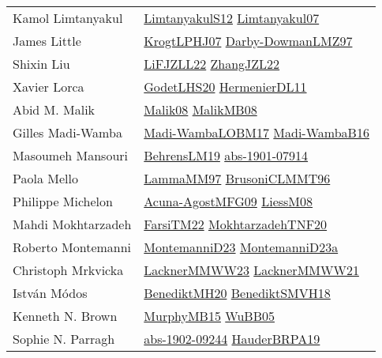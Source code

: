 {\begin{longtable}{p{4cm}p{20cm}}
Kamol Limtanyakul & \href{articles/LimtanyakulS12.pdf}{LimtanyakulS12}\cite{LimtanyakulS12} \href{papers/Limtanyakul07.pdf}{Limtanyakul07}\cite{Limtanyakul07} \\
James Little & \href{papers/KrogtLPHJ07.pdf}{KrogtLPHJ07}\cite{KrogtLPHJ07} \href{articles/Darby-DowmanLMZ97.pdf}{Darby-DowmanLMZ97}\cite{Darby-DowmanLMZ97} \\
Shixin Liu & \href{papers/LiFJZLL22.pdf}{LiFJZLL22}\cite{LiFJZLL22} \href{papers/ZhangJZL22.pdf}{ZhangJZL22}\cite{ZhangJZL22} \\
Xavier Lorca & \href{papers/GodetLHS20.pdf}{GodetLHS20}\cite{GodetLHS20} \href{papers/HermenierDL11.pdf}{HermenierDL11}\cite{HermenierDL11} \\
Abid M. Malik & \href{}{Malik08}\cite{Malik08} \href{}{MalikMB08}\cite{MalikMB08} \\
Gilles Madi{-}Wamba & \href{papers/Madi-WambaLOBM17.pdf}{Madi-WambaLOBM17}\cite{Madi-WambaLOBM17} \href{papers/Madi-WambaB16.pdf}{Madi-WambaB16}\cite{Madi-WambaB16} \\
Masoumeh Mansouri & \href{papers/BehrensLM19.pdf}{BehrensLM19}\cite{BehrensLM19} \href{articles/abs-1901-07914.pdf}{abs-1901-07914}\cite{abs-1901-07914} \\
Paola Mello & \href{articles/LammaMM97.pdf}{LammaMM97}\cite{LammaMM97} \href{papers/BrusoniCLMMT96.pdf}{BrusoniCLMMT96}\cite{BrusoniCLMMT96} \\
Philippe Michelon & \href{papers/Acuna-AgostMFG09.pdf}{Acuna-AgostMFG09}\cite{Acuna-AgostMFG09} \href{articles/LiessM08.pdf}{LiessM08}\cite{LiessM08} \\
Mahdi Mokhtarzadeh & \href{}{FarsiTM22}\cite{FarsiTM22} \href{}{MokhtarzadehTNF20}\cite{MokhtarzadehTNF20} \\
Roberto Montemanni & \href{articles/MontemanniD23.pdf}{MontemanniD23}\cite{MontemanniD23} \href{articles/MontemanniD23a.pdf}{MontemanniD23a}\cite{MontemanniD23a} \\
Christoph Mrkvicka & \href{articles/LacknerMMWW23.pdf}{LacknerMMWW23}\cite{LacknerMMWW23} \href{papers/LacknerMMWW21.pdf}{LacknerMMWW21}\cite{LacknerMMWW21} \\
Istv{\'{a}}n M{\'{o}}dos & \href{articles/BenediktMH20.pdf}{BenediktMH20}\cite{BenediktMH20} \href{papers/BenediktSMVH18.pdf}{BenediktSMVH18}\cite{BenediktSMVH18} \\
Kenneth N. Brown & \href{papers/MurphyMB15.pdf}{MurphyMB15}\cite{MurphyMB15} \href{papers/WuBB05.pdf}{WuBB05}\cite{WuBB05} \\
Sophie N. Parragh & \href{articles/abs-1902-09244.pdf}{abs-1902-09244}\cite{abs-1902-09244} \href{articles/HauderBRPA19.pdf}{HauderBRPA19}\cite{HauderBRPA19} \\

\end{longtable}}
